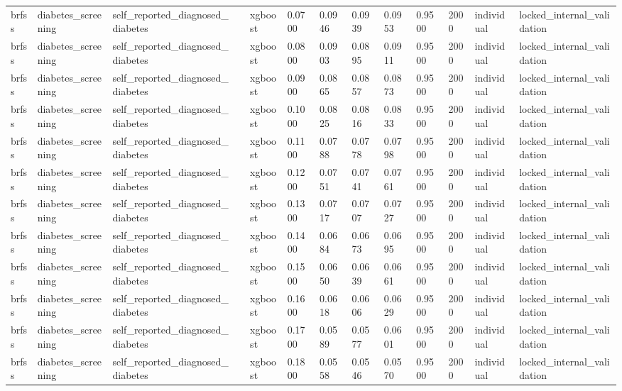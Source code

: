 \begin{tabular}{lllllllllllll}
brfss & diabetes\_screening & self\_reported\_diagnosed\_diabetes &  & xgboost & 0.0700 & 0.0946 & 0.0939 & 0.0953 & 0.9500 & 2000 & individual & locked\_internal\_validation \\
brfss & diabetes\_screening & self\_reported\_diagnosed\_diabetes &  & xgboost & 0.0800 & 0.0903 & 0.0895 & 0.0911 & 0.9500 & 2000 & individual & locked\_internal\_validation \\
brfss & diabetes\_screening & self\_reported\_diagnosed\_diabetes &  & xgboost & 0.0900 & 0.0865 & 0.0857 & 0.0873 & 0.9500 & 2000 & individual & locked\_internal\_validation \\
brfss & diabetes\_screening & self\_reported\_diagnosed\_diabetes &  & xgboost & 0.1000 & 0.0825 & 0.0816 & 0.0833 & 0.9500 & 2000 & individual & locked\_internal\_validation \\
brfss & diabetes\_screening & self\_reported\_diagnosed\_diabetes &  & xgboost & 0.1100 & 0.0788 & 0.0778 & 0.0798 & 0.9500 & 2000 & individual & locked\_internal\_validation \\
brfss & diabetes\_screening & self\_reported\_diagnosed\_diabetes &  & xgboost & 0.1200 & 0.0751 & 0.0741 & 0.0761 & 0.9500 & 2000 & individual & locked\_internal\_validation \\
brfss & diabetes\_screening & self\_reported\_diagnosed\_diabetes &  & xgboost & 0.1300 & 0.0717 & 0.0707 & 0.0727 & 0.9500 & 2000 & individual & locked\_internal\_validation \\
brfss & diabetes\_screening & self\_reported\_diagnosed\_diabetes &  & xgboost & 0.1400 & 0.0684 & 0.0673 & 0.0695 & 0.9500 & 2000 & individual & locked\_internal\_validation \\
brfss & diabetes\_screening & self\_reported\_diagnosed\_diabetes &  & xgboost & 0.1500 & 0.0650 & 0.0639 & 0.0661 & 0.9500 & 2000 & individual & locked\_internal\_validation \\
brfss & diabetes\_screening & self\_reported\_diagnosed\_diabetes &  & xgboost & 0.1600 & 0.0618 & 0.0606 & 0.0629 & 0.9500 & 2000 & individual & locked\_internal\_validation \\
brfss & diabetes\_screening & self\_reported\_diagnosed\_diabetes &  & xgboost & 0.1700 & 0.0589 & 0.0577 & 0.0601 & 0.9500 & 2000 & individual & locked\_internal\_validation \\
brfss & diabetes\_screening & self\_reported\_diagnosed\_diabetes &  & xgboost & 0.1800 & 0.0558 & 0.0546 & 0.0570 & 0.9500 & 2000 & individual & locked\_internal\_validation \\

\end{tabular}
